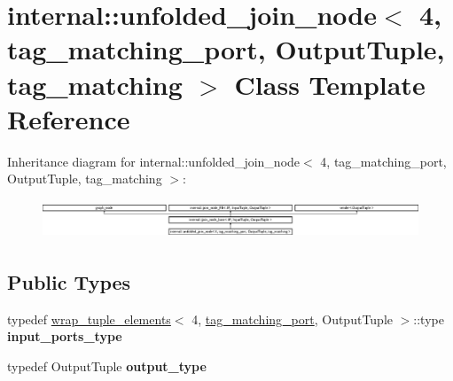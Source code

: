 \hypertarget{classinternal_1_1unfolded__join__node_3_014_00_01tag__matching__port_00_01OutputTuple_00_01tag__matching_01_4}{}\section{internal\+:\+:unfolded\+\_\+join\+\_\+node$<$ 4, tag\+\_\+matching\+\_\+port, Output\+Tuple, tag\+\_\+matching $>$ Class Template Reference}
\label{classinternal_1_1unfolded__join__node_3_014_00_01tag__matching__port_00_01OutputTuple_00_01tag__matching_01_4}
Inheritance diagram for internal\+:\+:unfolded\+\_\+join\+\_\+node$<$ 4, tag\+\_\+matching\+\_\+port, Output\+Tuple, tag\+\_\+matching $>$\+:\begin{figure}[H]
\begin{center}
\leavevmode
\includegraphics[height=1.161826cm]{classinternal_1_1unfolded__join__node_3_014_00_01tag__matching__port_00_01OutputTuple_00_01tag__matching_01_4}
\end{center}
\end{figure}
\subsection*{Public Types}
\begin{DoxyCompactItemize}
\item 
\hypertarget{classinternal_1_1unfolded__join__node_3_014_00_01tag__matching__port_00_01OutputTuple_00_01tag__matching_01_4_a3eaf2b78fb42a5c1e7d52ae444fc658f}{}typedef \hyperlink{structinternal_1_1wrap__tuple__elements}{wrap\+\_\+tuple\+\_\+elements}$<$ 4, \hyperlink{classinternal_1_1tag__matching__port}{tag\+\_\+matching\+\_\+port}, Output\+Tuple $>$\+::type {\bfseries input\+\_\+ports\+\_\+type}\label{classinternal_1_1unfolded__join__node_3_014_00_01tag__matching__port_00_01OutputTuple_00_01tag__matching_01_4_a3eaf2b78fb42a5c1e7d52ae444fc658f}

\item 
\hypertarget{classinternal_1_1unfolded__join__node_3_014_00_01tag__matching__port_00_01OutputTuple_00_01tag__matching_01_4_a5fd3710b399c5f0ce3a6b4caeb023906}{}typedef Output\+Tuple {\bfseries output\+\_\+type}\label{classinternal_1_1unfolded__join__node_3_014_00_01tag__matching__port_00_01OutputTuple_00_01tag__matching_01_4_a5fd3710b399c5f0ce3a6b4caeb023906}

\end{DoxyCompactItemize}
